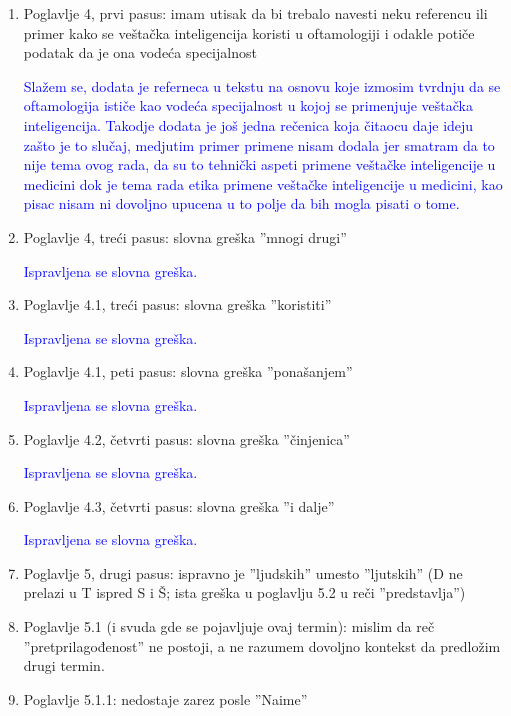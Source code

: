 \documentclass[a4paper]{report}
\newcommand{\odgovor}[1]{\textcolor{blue}{#1}}
\begin{document}
\begin{enumerate}
\item Poglavlje 4, prvi pasus: imam utisak da bi trebalo navesti neku referencu ili primer kako se veštačka inteligencija koristi u oftamologiji i odakle potiče podatak da je ona vodeća specijalnost 

\odgovor{Slažem se, dodata je referneca u tekstu na osnovu koje izmosim tvrdnju da se oftamologija ističe kao vodeća specijalnost u kojoj se primenjuje veštačka inteligencija. Takodje dodata je još jedna rečenica koja čitaocu daje ideju zašto je to slučaj, medjutim primer primene nisam dodala jer smatram da to nije tema ovog rada, da su to tehnički aspeti primene veštačke inteligencije u medicini dok je tema rada etika primene veštačke inteligencije u medicini, kao pisac nisam ni dovoljno upucena u to polje da bih mogla pisati o tome.} 

\item Poglavlje 4, treći pasus: slovna greška ''mnogi drugi''

\odgovor{Ispravljena se slovna greška.}

\item Poglavlje 4.1, treći pasus: slovna greška ''koristiti''

\odgovor{Ispravljena se slovna greška.}

\item Poglavlje 4.1, peti pasus: slovna greška ''ponašanjem''

\odgovor{Ispravljena se slovna greška.}

\item Poglavlje 4.2, četvrti pasus: slovna greška ''činjenica''

\odgovor{Ispravljena se slovna greška.}

\item Poglavlje 4.3, četvrti pasus: slovna greška ''i dalje''

\odgovor{Ispravljena se slovna greška.}

\item Poglavlje 5, drugi pasus: ispravno je ''ljudskih'' umesto ''ljutskih'' (D ne prelazi u T ispred S i Š; ista greška u poglavlju 5.2 u reči ''predstavlja'')

\item Poglavlje 5.1 (i svuda gde se pojavljuje ovaj termin): mislim da reč ''pretprilagođenost'' ne postoji, a ne razumem dovoljno kontekst da predložim drugi termin.

\item Poglavlje 5.1.1: nedostaje zarez posle ''Naime''


\end{enumerate}
\end{document}
